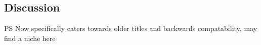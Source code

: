 \subsection{Discussion}

PS Now specifically caters towards older titles and backwards compatability, may find a niche here










